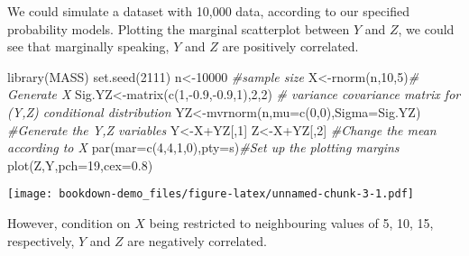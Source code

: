 \documentclass[
]{book}
\newenvironment{Shaded}{\begin{snugshade}}{\end{snugshade}}
\newcommand{\AttributeTok}[1]{\textcolor[rgb]{0.77,0.63,0.00}{#1}}
\newcommand{\CommentTok}[1]{\textcolor[rgb]{0.56,0.35,0.01}{\textit{#1}}}
\newcommand{\DecValTok}[1]{\textcolor[rgb]{0.00,0.00,0.81}{#1}}
\newcommand{\FloatTok}[1]{\textcolor[rgb]{0.00,0.00,0.81}{#1}}
\newcommand{\FunctionTok}[1]{\textcolor[rgb]{0.00,0.00,0.00}{#1}}
\newcommand{\NormalTok}[1]{#1}
\newcommand{\OtherTok}[1]{\textcolor[rgb]{0.56,0.35,0.01}{#1}}
\newcommand{\SpecialCharTok}[1]{\textcolor[rgb]{0.00,0.00,0.00}{#1}}
\newcommand{\StringTok}[1]{\textcolor[rgb]{0.31,0.60,0.02}{#1}}
\begin{document}
We could simulate a dataset with 10,000 data, according to our specified probability models. Plotting the marginal scatterplot between \(Y\) and \(Z\), we could see that marginally speaking, \(Y\) and \(Z\) are positively correlated.

\begin{Shaded}
\begin{Highlighting}[]
\FunctionTok{library}\NormalTok{(MASS) }
\FunctionTok{set.seed}\NormalTok{(}\DecValTok{2111}\NormalTok{) }
\NormalTok{n}\OtherTok{\textless{}{-}}\DecValTok{10000} \CommentTok{\#sample size}
\NormalTok{X}\OtherTok{\textless{}{-}}\FunctionTok{rnorm}\NormalTok{(n,}\DecValTok{10}\NormalTok{,}\DecValTok{5}\NormalTok{)}\CommentTok{\# Generate X}
\NormalTok{Sig.YZ}\OtherTok{\textless{}{-}}\FunctionTok{matrix}\NormalTok{(}\FunctionTok{c}\NormalTok{(}\DecValTok{1}\NormalTok{,}\SpecialCharTok{{-}}\FloatTok{0.9}\NormalTok{,}\SpecialCharTok{{-}}\FloatTok{0.9}\NormalTok{,}\DecValTok{1}\NormalTok{),}\DecValTok{2}\NormalTok{,}\DecValTok{2}\NormalTok{) }
\CommentTok{\# variance covariance matrix for (Y,Z) conditional distribution }
\NormalTok{YZ}\OtherTok{\textless{}{-}}\FunctionTok{mvrnorm}\NormalTok{(n,}\AttributeTok{mu=}\FunctionTok{c}\NormalTok{(}\DecValTok{0}\NormalTok{,}\DecValTok{0}\NormalTok{),}\AttributeTok{Sigma=}\NormalTok{Sig.YZ) }\CommentTok{\#Generate the Y,Z variables }
\NormalTok{Y}\OtherTok{\textless{}{-}}\NormalTok{X}\SpecialCharTok{+}\NormalTok{YZ[,}\DecValTok{1}\NormalTok{]}
\NormalTok{Z}\OtherTok{\textless{}{-}}\NormalTok{X}\SpecialCharTok{+}\NormalTok{YZ[,}\DecValTok{2}\NormalTok{] }\CommentTok{\#Change the mean according to X }
\FunctionTok{par}\NormalTok{(}\AttributeTok{mar=}\FunctionTok{c}\NormalTok{(}\DecValTok{4}\NormalTok{,}\DecValTok{4}\NormalTok{,}\DecValTok{1}\NormalTok{,}\DecValTok{0}\NormalTok{),}\AttributeTok{pty=}\StringTok{\textquotesingle{}s\textquotesingle{}}\NormalTok{)}\CommentTok{\#Set up the plotting margins }
\FunctionTok{plot}\NormalTok{(Z,Y,}\AttributeTok{pch=}\DecValTok{19}\NormalTok{,}\AttributeTok{cex=}\FloatTok{0.8}\NormalTok{)}
\end{Highlighting}
\end{Shaded}

\texttt{[image: bookdown-demo\_files/figure-latex/unnamed-chunk-3-1.pdf]}

However, condition on \(X\) being restricted to neighbouring values of 5, 10, 15, respectively, \(Y\) and \(Z\) are negatively correlated.
\end{document}
